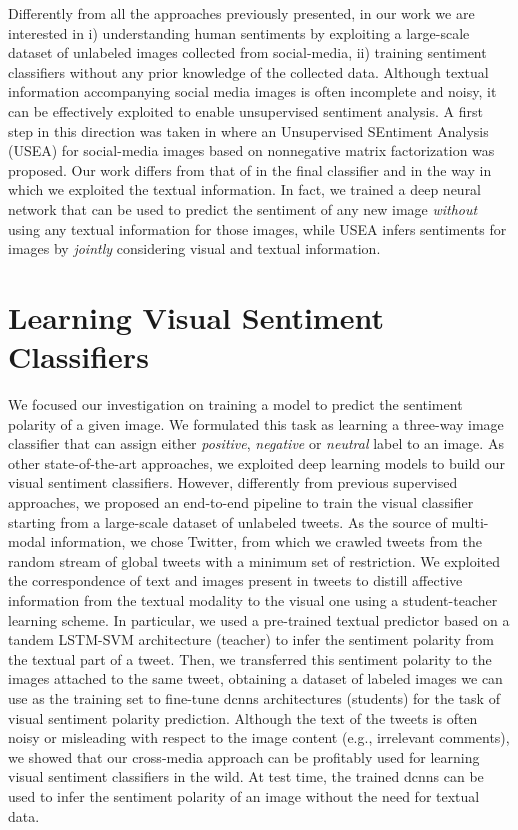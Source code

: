Differently from all the approaches previously presented, in our work we are interested in i) understanding human sentiments by exploiting a large-scale dataset of unlabeled images collected from social-media, ii) training sentiment classifiers without any prior knowledge of the collected data.
Although textual information accompanying social media images is often incomplete and noisy, it can be effectively exploited to enable unsupervised sentiment analysis.
A first step in this direction was taken in \cite{wang2015unsupervised} where an Unsupervised SEntiment Analysis (USEA) for social-media images based on nonnegative matrix factorization was proposed.
Our work differs from that of \citet{wang2015unsupervised} in the final classifier and in the way in which we exploited the textual information.
In fact, we trained a deep neural network that can be used to predict the sentiment of any new image \emph{without} using any textual information for those images, while USEA infers sentiments for images by \emph{jointly} considering visual and textual information.


\section{Learning Visual Sentiment Classifiers}

We focused our investigation on training a model to predict the sentiment polarity of a given image.
We formulated this task as learning a three-way image classifier that can assign either \emph{positive}, \emph{negative} or \emph{neutral} label to an image.
As other state-of-the-art approaches, we exploited deep learning models to build our visual sentiment classifiers.
However, differently from previous supervised approaches, we proposed an end-to-end pipeline to train the visual classifier starting from a large-scale dataset of unlabeled tweets.
As the source of multi-modal information, we chose Twitter, from which we crawled tweets from the random stream of global tweets with a minimum set of restriction.
We exploited the correspondence of text and images present in tweets to distill affective information from the textual modality to the visual one using a student-teacher learning scheme.
In particular, we used a pre-trained textual predictor based on a tandem \gls{LSTM}-\gls{SVM} architecture (teacher) to infer the sentiment polarity from the textual part of a tweet.
Then, we transferred this sentiment polarity to the images attached to the same tweet, obtaining a dataset of labeled images we can use as the training set to fine-tune \glspl{dcnn} architectures (students) for the task of visual sentiment polarity prediction.
Although the text of the tweets is often noisy or misleading with respect to the image content (e.g., irrelevant comments), we showed that our cross-media approach can be profitably used for learning visual sentiment classifiers in the wild.
At test time, the trained \glspl{dcnn} can be used to infer the sentiment polarity of an image without the need for textual data.

